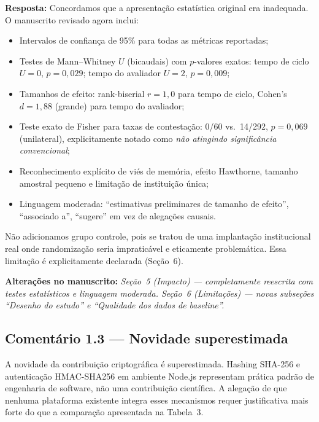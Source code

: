 \documentclass[11pt,a4paper]{article}
\newcommand{\response}[1]{\par\noindent\textcolor{responsecolor}{\textbf{Resposta:}} #1}
\newcommand{\change}[1]{\par\noindent\textcolor{changecolor}{\textbf{Alterações no manuscrito:}} \textit{#1}}
\begin{document}
\response{Concordamos que a apresentação estatística original era inadequada. O manuscrito revisado agora inclui:}

\begin{itemize}[nosep]
  \item Intervalos de confiança de 95\% para todas as métricas reportadas;
  \item Testes de Mann--Whitney $U$ (bicaudais) com $p$-valores exatos: tempo de ciclo $U=0$, $p=0{,}029$; tempo do avaliador $U=2$, $p=0{,}009$;
  \item Tamanhos de efeito: rank-biserial $r=1{,}0$ para tempo de ciclo, Cohen's $d=1{,}88$ (grande) para tempo do avaliador;
  \item Teste exato de Fisher para taxas de contestação: 0/60 vs.\ 14/292, $p=0{,}069$ (unilateral), explicitamente notado como \emph{não atingindo significância convencional};
  \item Reconhecimento explícito de viés de memória, efeito Hawthorne, tamanho amostral pequeno e limitação de instituição única;
  \item Linguagem moderada: ``estimativas preliminares de tamanho de efeito'', ``associado a'', ``sugere'' em vez de alegações causais.
\end{itemize}

Não adicionamos grupo controle, pois se tratou de uma implantação institucional real onde randomização seria impraticável e eticamente problemática. Essa limitação é explicitamente declarada (Seção~6).

\change{Seção~5 (Impacto) --- completamente reescrita com testes estatísticos e linguagem moderada. Seção~6 (Limitações) --- novas subseções ``Desenho do estudo'' e ``Qualidade dos dados de baseline''.}

\bigskip

\subsection*{Comentário 1.3 --- Novidade superestimada}

\begin{reviewerbox}
A novidade da contribuição criptográfica é superestimada. Hashing SHA-256 e autenticação HMAC-SHA256 em ambiente Node.js representam prática padrão de engenharia de software, não uma contribuição científica. A alegação de que nenhuma plataforma existente integra esses mecanismos requer justificativa mais forte do que a comparação apresentada na Tabela~3.
\end{reviewerbox}
\end{document}
